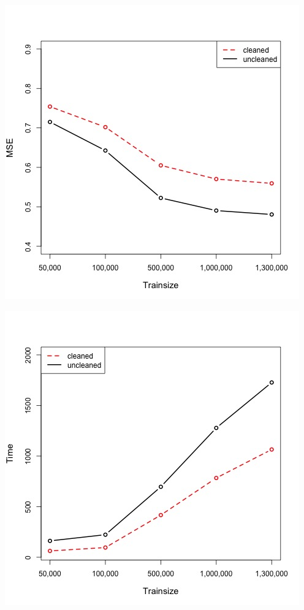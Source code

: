 \documentclass[letterpaper]{article} %
\begin{document}
\begin{center}
\centering
\includegraphics[width=\columnwidth]{../Plots/NBSVM_unclean_clean.jpeg}
\label{fig:mse_unclean}
\end{center}

\begin{center}
\centering
\includegraphics[width=\columnwidth]{../Plots/NBSVM_runtime_sample.jpeg}
\label{fig:runtime_unclean}
\end{center}



\end{document}
